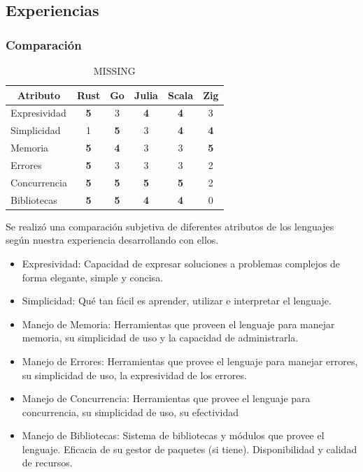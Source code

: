 \documentclass[11pt]{article}
\let\Oldsubsection\subsection
\renewcommand{\subsection}{\FloatBarrier\Oldsubsection}
\let\Oldsubsubsection\subsubsection
\renewcommand{\subsubsection}{\FloatBarrier\Oldsubsubsection}
\newcommand{\badMetric}[1]{{\color{BrickRed}#1}}
\newcommand{\goodMetric}[1]{{\textbf{#1}}}
\begin{document}
\subsection{Experiencias}

\subsubsection{Comparación}

\begin{table}[h]
\centering
\begin{tabular}{|l|c|c|c|c|c|}
\hline
\multicolumn{1}{|c|}{Atributo} & Rust & Go & Julia & Scala & Zig \\ \hline
Expresividad & \goodMetric{5} & 3 & \goodMetric{4} & \goodMetric{4} & 3 \\ \hline
Simplicidad & \badMetric{1} & \goodMetric{5} & 3 & \goodMetric{4} & \goodMetric{4} \\ \hline
Memoria & \goodMetric{5} & \goodMetric{4} & 3 & 3 & \goodMetric{5} \\ \hline
Errores & \goodMetric{5} & 3 & 3 & 3 & \badMetric{2} \\ \hline
Concurrencia & \goodMetric{5} & \goodMetric{5} & \goodMetric{5} & \goodMetric{5} & \badMetric{2} \\ \hline
Bibliotecas & \goodMetric{5} & \goodMetric{5} & \goodMetric{4} & \goodMetric{4} & \badMetric{0} \\ \hline
\end{tabular}
\caption{MISSING} %
\end{table}

Se realizó una comparación subjetiva de diferentes atributos de los lenguajes según nuestra experiencia desarrollando con ellos.

\begin{itemize}
    \item Expresividad: Capacidad de expresar soluciones a problemas complejos de forma elegante, simple y concisa.
    \item Simplicidad: Qué tan fácil es aprender, utilizar e interpretar el lenguaje.
    \item Manejo de Memoria: Herramientas que proveen el lenguaje para manejar memoria, su simplicidad de uso y la capacidad de administrarla.
    \item Manejo de Errores: Herramientas que provee el lenguaje para manejar errores, su simplicidad de uso, la expresividad de los errores.
    \item Manejo de Concurrencia: Herramientas que provee el lenguaje para concurrencia, su simplicidad de uso, su efectividad
    \item Manejo de Bibliotecas: Sistema de bibliotecas y módulos que provee el lenguaje. Eficacia de su gestor de paquetes (si tiene). Disponibilidad y calidad de recursos.
\end{itemize}
\end{document}
